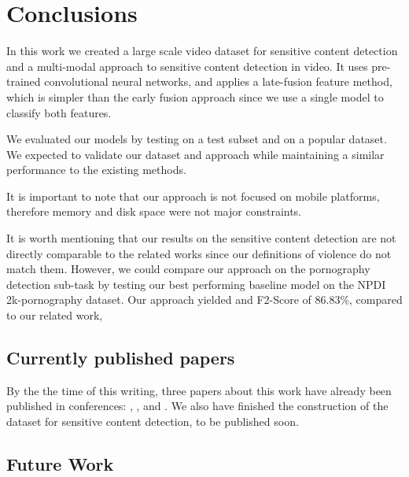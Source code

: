 \newpage

\chapter{Conclusions}
\label{chap:conclusions}

In this work we created a large scale video dataset for sensitive content detection and a multi-modal approach to sensitive content detection in video. 
It uses pre-trained convolutional neural networks, and applies a late-fusion feature method, which is simpler than the early fusion approach since we use a single model to classify both features.

We evaluated our models by testing on a test subset and on a popular dataset. We expected to validate our dataset and approach while maintaining a similar performance to the existing methods.

It is important to note that our approach is not focused on mobile platforms, therefore memory and disk space were not major constraints. 

It is worth mentioning that our results on the sensitive content detection are not directly comparable to the related works since our definitions of violence do not match them. However, we could compare our approach on the pornography detection sub-task by testing our best performing baseline model on the NPDI 2k-pornography dataset. Our approach yielded and F2-Score of 86.83\%, compared to our related work, 

\section{Currently published papers}
\label{sec:contrib}

By the the time of this writing, three papers about this work have already been published in conferences: \cite{2019NSFWbaseline}, \cite{2020PornDetectionSBIE}, and \cite{shouldisee}. We also have finished the construction of the dataset for sensitive content detection, to be published soon.

\section{Future Work}
\label{sec:future}


